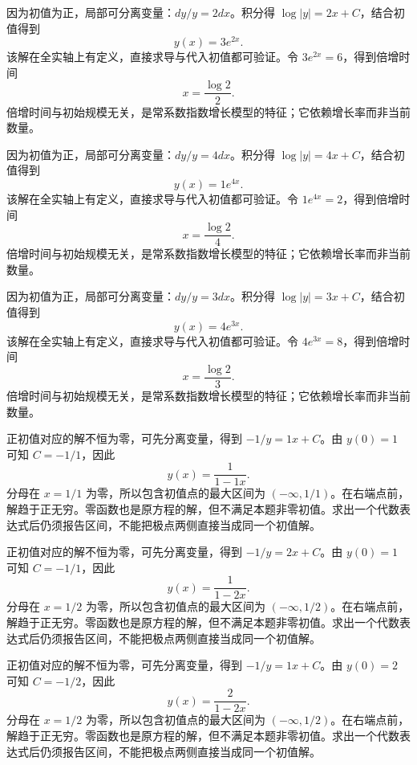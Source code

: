 \documentclass[UTF8,12pt,a4paper,fontset=fandol]{ctexart}
\begin{document}
\begin{solve}\label{ans:c22q4}
因为初值为正，局部可分离变量：$dy/y=2dx$。积分得 $\log|y|=2x+C$，结合初值得到
\[
y(x)=3e^{2x}.
\]
该解在全实轴上有定义，直接求导与代入初值都可验证。令 $3e^{2x}=6$，得到倍增时间
\[
x=\frac{\log2}{2}.
\]
倍增时间与初始规模无关，是常系数指数增长模型的特征；它依赖增长率而非当前数量。
\end{solve}

\begin{solve}\label{ans:c22q5}
因为初值为正，局部可分离变量：$dy/y=4dx$。积分得 $\log|y|=4x+C$，结合初值得到
\[
y(x)=1e^{4x}.
\]
该解在全实轴上有定义，直接求导与代入初值都可验证。令 $1e^{4x}=2$，得到倍增时间
\[
x=\frac{\log2}{4}.
\]
倍增时间与初始规模无关，是常系数指数增长模型的特征；它依赖增长率而非当前数量。
\end{solve}

\begin{solve}\label{ans:c22q6}
因为初值为正，局部可分离变量：$dy/y=3dx$。积分得 $\log|y|=3x+C$，结合初值得到
\[
y(x)=4e^{3x}.
\]
该解在全实轴上有定义，直接求导与代入初值都可验证。令 $4e^{3x}=8$，得到倍增时间
\[
x=\frac{\log2}{3}.
\]
倍增时间与初始规模无关，是常系数指数增长模型的特征；它依赖增长率而非当前数量。
\end{solve}

\begin{solve}\label{ans:c22q7}
正初值对应的解不恒为零，可先分离变量，得到 $-1/y=1x+C$。由 $y(0)=1$ 可知 $C=-1/1$，因此
\[
y(x)=\frac{1}{1-1x}.
\]
分母在 $x=1/1$ 为零，所以包含初值点的最大区间为 $(-\infty,1/1)$。在右端点前，解趋于正无穷。零函数也是原方程的解，但不满足本题非零初值。求出一个代数表达式后仍须报告区间，不能把极点两侧直接当成同一个初值解。
\end{solve}

\begin{solve}\label{ans:c22q8}
正初值对应的解不恒为零，可先分离变量，得到 $-1/y=2x+C$。由 $y(0)=1$ 可知 $C=-1/1$，因此
\[
y(x)=\frac{1}{1-2x}.
\]
分母在 $x=1/2$ 为零，所以包含初值点的最大区间为 $(-\infty,1/2)$。在右端点前，解趋于正无穷。零函数也是原方程的解，但不满足本题非零初值。求出一个代数表达式后仍须报告区间，不能把极点两侧直接当成同一个初值解。
\end{solve}

\begin{solve}\label{ans:c22q9}
正初值对应的解不恒为零，可先分离变量，得到 $-1/y=1x+C$。由 $y(0)=2$ 可知 $C=-1/2$，因此
\[
y(x)=\frac{2}{1-2x}.
\]
分母在 $x=1/2$ 为零，所以包含初值点的最大区间为 $(-\infty,1/2)$。在右端点前，解趋于正无穷。零函数也是原方程的解，但不满足本题非零初值。求出一个代数表达式后仍须报告区间，不能把极点两侧直接当成同一个初值解。
\end{solve}
\end{document}
